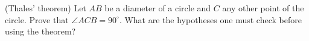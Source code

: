 (Thales' theorem) Let $AB$ be a diameter of a circle and $C$ any other point of the circle. Prove that $\angle ACB=90^\circ$. What are the hypotheses one must check before using the theorem?
